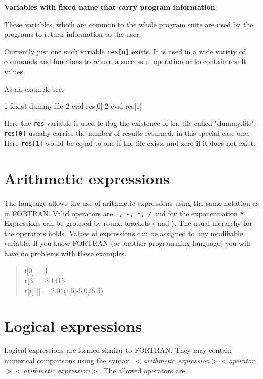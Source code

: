 {\bf Variables with fixed name that carry program information}

These variables, which are common to the whole program suite are 
used by the programs to return information to the user.

Currently just one such variable {\tt res[n]} exists. It is used
in a wide variety of commands and functions to return a successful
operation or to contain result values.

As an example see:
%
\begin{MacVerbatim}
   1  fexist dummy.file
   2  eval res[0]
   2  eval res[1]
\end{MacVerbatim}
%
Here the {\tt res} variable is used to flag the existence of the file
called "dummy.file". {\tt res[0]} usually carries the number of 
results returned, in this special case one. Here {\tt res[1]} would
be equal to one if the file exists and zero if it does not exist.



\section{Arithmetic expressions \label{arith-exp}}

The language allows the use of arithmetic expressions using the same
notation as in FORTRAN. Valid operators are {\tt +, -, *, /} and
for the exponentiation {\tt **}. Expressions can be grouped by 
round brackets ( and ). The
usual hierarchy for the operators holds. Values of expressions can
be assigned to any modifiable variable. If you know FORTRAN (or
another programming language) you will have no problems with these
examples.

\begin{quote}
  i[0] = 1 \\
  r[3] = 3.1415 \\
  r[i[1]] = 2.0*(i[5]-5.0/6.5)
\end{quote}


\section{Logical expressions \label{log-exp}}

Logical expressions are formed similar to FORTRAN. They may contain
numerical comparisons using the syntax: {\it $<$arithmetic
expression$><$operator$><$arithmetic expression$>$}. The allowed
operators are 

